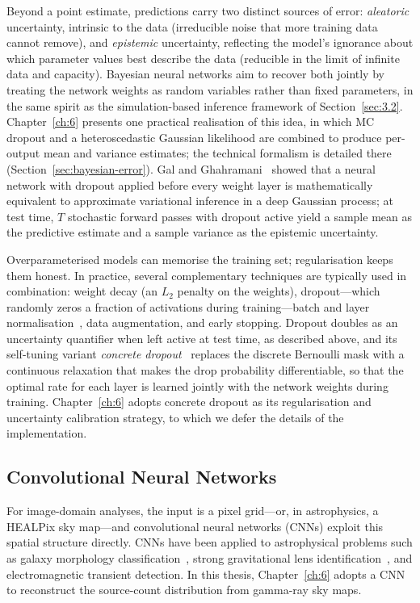 Beyond a point estimate, predictions carry two distinct sources of error: \textit{aleatoric} uncertainty, intrinsic to the data (irreducible noise that more training data cannot remove), and \textit{epistemic} uncertainty, reflecting the model's ignorance about which parameter values best describe the data (reducible in the limit of infinite data and capacity).
Bayesian neural networks aim to recover both jointly by treating the network weights as random variables rather than fixed parameters, in the same spirit as the simulation-based inference framework of Section~\ref{sec:3.2}.
Chapter~\ref{ch:6} presents one practical realisation of this idea, in which MC dropout and a heteroscedastic Gaussian likelihood are combined to produce per-output mean and variance estimates; the technical formalism is detailed there (Section~\ref{sec:bayesian-error}).
Gal and Ghahramani~\cite{mcdropout} showed that a neural network with dropout applied before every weight layer is mathematically equivalent to approximate variational inference in a deep Gaussian process; at test time, $T$ stochastic forward passes with dropout active yield a sample mean as the predictive estimate and a sample variance as the epistemic uncertainty.

Overparameterised models can memorise the training set; regularisation keeps them honest.
In practice, several complementary techniques are typically used in combination: weight decay (an $L_2$ penalty on the weights), dropout---which randomly zeros a fraction of activations during training---batch and layer normalisation~\cite{batchnorm}, data augmentation, and early stopping.
Dropout doubles as an uncertainty quantifier when left active at test time, as described above, and its self-tuning variant \textit{concrete dropout}~\cite{concrete-dropout} replaces the discrete Bernoulli mask with a continuous relaxation that makes the drop probability differentiable, so that the optimal rate for each layer is learned jointly with the network weights during training.
Chapter~\ref{ch:6} adopts concrete dropout as its regularisation and uncertainty calibration strategy, to which we defer the details of the implementation.

\subsection{Convolutional Neural Networks}
\label{sec:3.3.3}

For image-domain analyses, the input is a pixel grid---or, in astrophysics, a HEALPix sky map---and convolutional neural networks (CNNs) exploit this spatial structure directly.
CNNs have been applied to astrophysical problems such as galaxy morphology classification~\cite{Dieleman:2015wdg}, strong gravitational lens identification~\cite{Hezaveh:2017sht}, and electromagnetic transient detection.
In this thesis, Chapter~\ref{ch:6} adopts a CNN to reconstruct the source-count distribution from gamma-ray sky maps.

